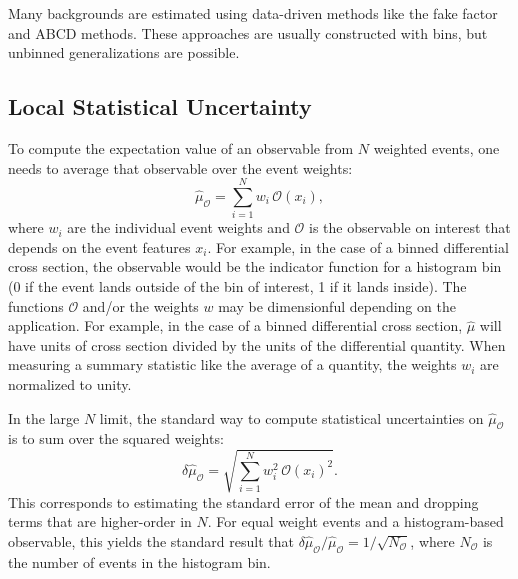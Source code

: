 \documentclass[a4paper,11pt]{article}
\begin{document}
Many backgrounds are estimated using data-driven methods like the fake factor and ABCD methods.  These approaches are usually constructed with bins, but unbinned generalizations are possible.

\subsection{Local Statistical Uncertainty}

To compute the expectation value of an observable from $N$ weighted events, one needs to average that observable over the event weights:
%
\begin{equation}
    \label{eq:weight_sum}
    \hat{\mu}_\mathcal{O} = \sum_{i=1}^N w_i \, \mathcal{O}(x_i),
\end{equation}
%
where $w_i$ are the individual event weights
% 
and $\mathcal{O}$ is the observable on interest that depends on the event features $x_i$.
%
For example, in the case of a binned differential cross section, the observable would be the indicator function for a histogram bin (0 if the event lands outside of the bin of interest, 1 if it lands inside).  The functions $\mathcal{O}$ and/or the weights $w$ may be dimensionful depending on the application.  For example, in the case of a binned differential cross section, $\hat{\mu}$ will have units of cross section divided by the units of the differential quantity.  When measuring a summary statistic like the average of a quantity, the weights $w_i$ are normalized to unity.


In the large $N$ limit, the standard way to compute statistical uncertainties on $\hat{\mu}_\mathcal{O}$ is to sum over the squared weights:
%
\begin{equation}
    \label{eq:weight_squared_sum}
    \delta\hat{\mu}_\mathcal{O} = \sqrt{\sum_{i=1}^N w_i^2 \, \mathcal{O}(x_i)^2}.
\end{equation}
%
This corresponds to estimating the standard error of the mean and dropping terms that are higher-order in $N$.
%
For equal weight events and a histogram-based observable, this yields the standard result that $\delta\hat{\mu}_\mathcal{O} / \hat{\mu}_\mathcal{O} = 1/\sqrt{N_\mathcal{O}}$, where $N_\mathcal{O}$ is the number of events in the histogram bin.
\end{document}
